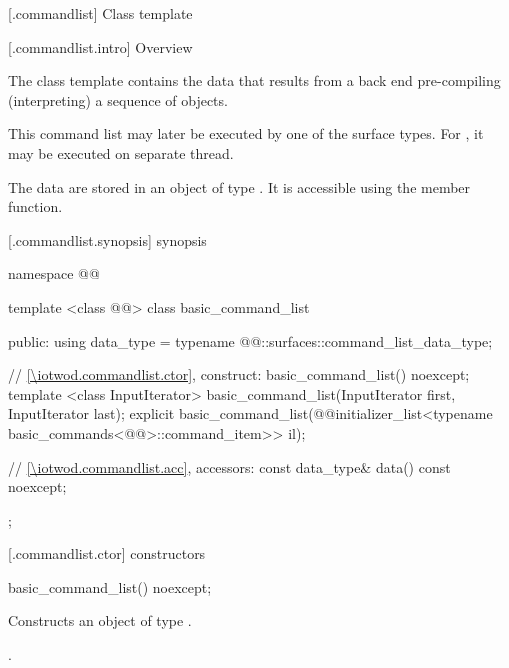  [\iotwod.commandlist] {Class template }

 [\iotwod.commandlist.intro] {Overview}

\pnum
{}%
The class template  contains the data that results from a back end pre-compiling (interpreting) a sequence of  objects.

\pnum
This command list may later be executed by one of the surface types. For , it may be executed on separate thread.

\pnum
The data are stored in an object of type . It is accessible using the  member function.

 [\iotwod.commandlist.synopsis] { synopsis}

\begin{codeblock}
namespace @\fullnamespace{}@ {
  template <class @\graphicssurfacestemplparamnospace{}@>
  class basic_command_list {
  public:
    using data_type = typename 
      @\graphicssurfacestemplparamnospace{}@::surfaces::command_list_data_type;
      
    // \ref{\iotwod.commandlist.ctor}, construct:
    basic_command_list() noexcept;
    template <class InputIterator>
    basic_command_list(InputIterator first, InputIterator last);
    explicit basic_command_list(@\stdqualifier{}@initializer_list<typename
      basic_commands<@\graphicssurfacestemplparamnospace{}@>::command_item>> il);    
    
    // \ref{\iotwod.commandlist.acc}, accessors:
    const data_type& data() const noexcept;
  };
}
\end{codeblock}

 [\iotwod.commandlist.ctor] { constructors}

%
\begin{itemdecl}
basic_command_list() noexcept;
\end{itemdecl}
\begin{itemdescr}
\pnum
\pnum
\effects
Constructs an object of type .

\pnum
\postconditions
{}.
\end{itemdescr}

